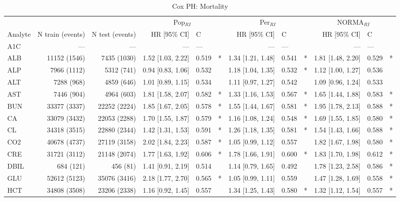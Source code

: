 \begin{table}[ht]
\centering
\footnotesize
\caption{Cox PH: Mortality}
\begin{tabular}{lrrrlcrlcrlc}
\toprule
 & &  & \multicolumn{3}{c}{Pop$_{RI}$} & \multicolumn{3}{c}{Per$_{RI}$} & \multicolumn{3}{c}{NORMA$_{RI}$} \\
\cmidrule(lr){4-6} \cmidrule(lr){7-9} \cmidrule(lr){10-12}
Analyte & N train (events) & N test (events) & HR [95\% CI] & C &  & HR [95\% CI] & C &  & HR [95\% CI] & C &  \\
\midrule
A1C & --- & --- & --- & --- &  & --- & --- &  & --- & --- &  \\
ALB & 11152 (1546) & 7435 (1030) & 1.52 [1.03, 2.22] & 0.519 & * & 1.34 [1.21, 1.48] & 0.541 & * & 1.81 [1.48, 2.20] & 0.529 & * \\
ALP & 7966 (1112) & 5312 (741) & 0.94 [0.83, 1.06] & 0.532 &  & 1.18 [1.04, 1.35] & 0.532 & * & 1.12 [1.00, 1.27] & 0.536 &  \\
ALT & 7288 (968) & 4859 (646) & 1.01 [0.89, 1.15] & 0.534 &  & 1.11 [0.97, 1.27] & 0.542 &  & 1.09 [0.96, 1.24] & 0.533 &  \\
AST & 7446 (904) & 4964 (603) & 1.81 [1.58, 2.07] & 0.582 & * & 1.33 [1.16, 1.53] & 0.567 & * & 1.65 [1.44, 1.88] & 0.583 & * \\
BUN & 33377 (3337) & 22252 (2224) & 1.85 [1.67, 2.05] & 0.578 & * & 1.55 [1.44, 1.67] & 0.581 & * & 1.95 [1.78, 2.13] & 0.588 & * \\
CA & 33079 (3432) & 22053 (2288) & 1.70 [1.55, 1.87] & 0.579 & * & 1.16 [1.08, 1.24] & 0.548 & * & 1.69 [1.55, 1.85] & 0.580 & * \\
CL & 34318 (3515) & 22880 (2344) & 1.42 [1.31, 1.53] & 0.591 & * & 1.26 [1.18, 1.35] & 0.581 & * & 1.54 [1.43, 1.66] & 0.588 & * \\
CO2 & 40678 (4737) & 27119 (3158) & 2.02 [1.84, 2.23] & 0.587 & * & 1.05 [0.99, 1.12] & 0.557 &  & 1.82 [1.67, 1.98] & 0.580 & * \\
CRE & 31721 (3112) & 21148 (2074) & 1.77 [1.63, 1.92] & 0.606 & * & 1.78 [1.66, 1.91] & 0.600 & * & 1.83 [1.70, 1.98] & 0.612 & * \\
DBIL & 684 (121) & 456 (81) & 1.41 [0.91, 2.19] & 0.514 &  & 1.14 [0.79, 1.65] & 0.492 &  & 1.78 [1.23, 2.58] & 0.586 & * \\
GLU & 52612 (5123) & 35076 (3416) & 2.18 [1.77, 2.70] & 0.565 & * & 1.05 [0.99, 1.11] & 0.559 &  & 1.47 [1.28, 1.69] & 0.558 & * \\
HCT & 34808 (3508) & 23206 (2338) & 1.16 [0.92, 1.45] & 0.557 &  & 1.34 [1.25, 1.43] & 0.580 & * & 1.32 [1.12, 1.54] & 0.557 & * \\

\end{tabular}
\end{table}
